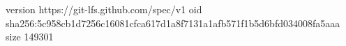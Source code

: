 version https://git-lfs.github.com/spec/v1
oid sha256:5c958cb1d7256c16081cfca617d1a8f7131a1afb571f1b5d6bfd034008fa5aaa
size 149301
